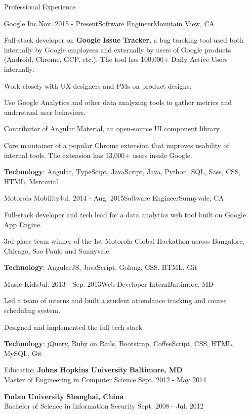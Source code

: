 \documentclass{resume} %
\begin{document}
\begin{rSection}{Professional Experience}

\begin{rSubsection}{Google Inc.}{Nov. 2015 - Present}{Software Engineer}{Mountain View, CA}
\item Full-stack developer on \textbf{Google Issue Tracker}, a bug tracking tool used both internally by Google employees and externally by users of Google products (Android, Chrome, GCP, etc.). The tool has 100,000+ Daily Active Users internally.
\item Work closely with UX designers and PMs on product designs.
\item Use Google Analytics and other data analyzing tools to gather metrics and understand user behaviors.
\item Contributor of Angular Material, an open-source UI component library.
\item Core maintainer of a popular Chrome extension that improves usability of internal tools. The extension has 13,000+ users inside Google.
\item \textbf{Technology}: Angular, TypeScipt, JavaScript, Java, Python, SQL, Sass, CSS, HTML, Mercurial

\end{rSubsection}

\begin{rSubsection}{Motorola Mobility}{Jul. 2014 - Aug. 2015}{Software Engineer}{Sunnyvale, CA}
\item Full-stack developer and tech lead for a data analytics web tool built on Google App Engine.
\item 3rd place team winner of the 1st Motorola Global Hackathon across Bangalore, Chicago, Sao Paulo and Sunnyvale.
\item \textbf{Technology}: AngularJS, JavaScript, Golang, CSS, HTML, Git
\end{rSubsection}

\begin{rSubsection}{Music Kids}{Jul. 2013 - Sep. 2013}{Web Developer Intern}{Baltimore, MD}
\item Led a team of interns and built a student attendance tracking and course scheduling system.
\item Designed and implemented the full tech stack.
\item \textbf{Technology}: jQuery, Ruby on Rails, Bootstrap, CoffeeScript, CSS, HTML, MySQL, Git
\end{rSubsection}

\end{rSection}



\begin{rSection}{Education}
{\bf Johns Hopkins University} \hfill {\bf Baltimore, MD} \\
{Master of Engineering in Computer Science} \hfill {Sept. 2012 - May 2014}

{\bf Fudan University} \hfill {\bf Shanghai, China} \\
{Bachelor of Science in Information Security} \hfill {Sept. 2008 - Jul. 2012}
\end{rSection}
\end{document}

